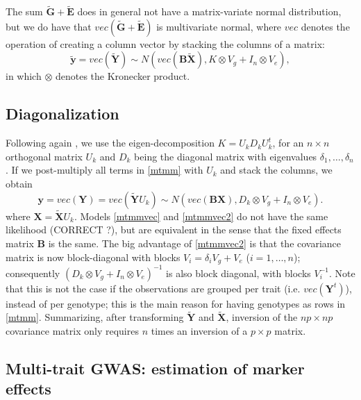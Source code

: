 \documentclass[12pt]{article}
\begin{document}
The sum $\mathbf{\tilde G} + \mathbf{\tilde E}$ does in general not have a matrix-variate normal distribution, but we do have that $vec(\mathbf{\tilde G} + \mathbf{\tilde E})$ is multivariate normal, where $vec$ denotes the operation of creating a column vector by stacking the columns of a matrix:
%
\begin{equation} \label{mtmmvec}
\mathbf{\tilde y} = vec(\mathbf{\tilde Y}) \sim N\left(vec(\mathbf{B}  \mathbf{\tilde X}),  K \otimes V_g  + I_n \otimes V_e\right),
\end{equation}
in which $\otimes$ denotes the Kronecker product.

\subsection{Diagonalization}

Following again \cite{zhou_stephens_2014}, we use the eigen-decomposition  $K = U_k D_k U_k^t$, for an $n \times n$ orthogonal matrix $U_k$ and $D_k$ being the diagonal matrix with eigenvalues $\delta_1,\ldots,\delta_n$. If we post-multiply all terms in \eqref{mtmm} with $U_k$ and stack the columns, we obtain  
%
\begin{equation} \label{mtmmvec2}
\mathbf{y} = vec(\mathbf{Y}) = vec(\mathbf{\tilde Y} U_k) \sim N\left(vec(\mathbf{B} \mathbf{X}),  D_k \otimes V_g  + I_n \otimes V_e\right).
\end{equation}
%
where $\mathbf{X} = \mathbf{\tilde X} U_k$. Models \eqref{mtmmvec} and \eqref{mtmmvec2} do not have the same likelihood (CORRECT ?), but are equivalent in the sense that the fixed effects matrix $\mathbf{B}$ is the same. The big advantage of \eqref{mtmmvec2} is that the covariance matrix is now block-diagonal with blocks $V_i = \delta_i V_g + V_e$ ($i = 1,\ldots,n$); consequently $(D_k \otimes V_g  + I_n \otimes V_e)^{-1}$ is also block diagonal, with blocks $V_i^{-1}$. Note that this is not the case if the observations are grouped per trait (i.e. $vec(\mathbf{Y}^t)$), instead of per genotype; this is the main reason for having genotypes as rows in \eqref{mtmm}. Summarizing, after transforming $\mathbf{\tilde Y}$ and $\mathbf{\tilde X}$, inversion of the  $np \times np$ covariance matrix  only requires $n$ times an inversion of a $p \times p$ matrix.

\subsection{Multi-trait GWAS: estimation of marker effects} \label{gwas}
\end{document}
